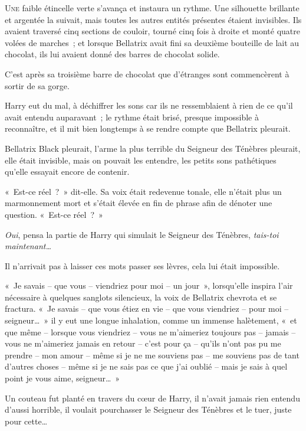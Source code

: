 
\lettrine{U}{ne} faible étincelle verte s'avança et instaura un rythme.
Une silhouette brillante et argentée la suivait, mais toutes les autres entités présentes étaient invisibles.
Ils avaient traversé cinq sections de couloir, tourné cinq fois à droite et monté quatre volées de marches~; et lorsque Bellatrix avait fini sa deuxième bouteille de lait au chocolat, ils lui avaient donné des barres de chocolat solide.

C'est après sa troisième barre de chocolat que d'étranges sont commencèrent à sortir de sa gorge.

Harry eut du mal, à déchiffrer les sons car ils ne ressemblaient à rien de ce qu'il avait entendu auparavant~; le rythme était brisé, presque impossible à reconnaître, et il mit bien longtemps à se rendre compte que Bellatrix pleurait.

Bellatrix Black pleurait, l'arme la plus terrible du Seigneur des Ténèbres pleurait, elle était invisible, mais on pouvait les entendre, les petits sons pathétiques qu'elle essayait encore de contenir.

«~Est-ce réel~?~»
dit-elle.
Sa voix était redevenue tonale, elle n'était plus un marmonnement mort et s'était élevée en fin de phrase afin de dénoter une question.
«~Est-ce réel~?~»

\emph{Oui}, pensa la partie de Harry qui simulait le Seigneur des Ténèbres, \emph{tais-toi maintenant…}

Il n'arrivait pas à laisser ces mots passer ses lèvres, cela lui était impossible.

«~Je savais -- que vous -- viendriez pour moi -- un jour~», lorsqu'elle inspira l'air nécessaire à quelques sanglots silencieux, la voix de Bellatrix chevrota et se fractura.
«~Je savais -- que vous étiez en vie -- que vous viendriez -- pour moi -- seigneur…~»
il y eut une longue inhalation, comme un immense halètement, «~et que même -- lorsque vous viendriez -- vous ne m'aimeriez toujours pas -- jamais -- vous ne m'aimeriez jamais en retour -- c'est pour ça -- qu'ils n'ont pas pu me prendre -- mon amour -- même si je ne me souviens pas -- me souviens pas de tant d'autres choses -- même si je ne sais pas ce que j'ai oublié -- mais je sais à quel point je vous aime, seigneur…~»

Un couteau fut planté en travers du cœur de Harry, il n'avait jamais rien entendu d'aussi horrible, il voulait pourchasser le Seigneur des Ténèbres et le tuer, juste pour cette…

